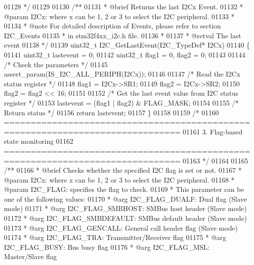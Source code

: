 \begin{DoxyCode}
01128 \textcolor{comment}{ */}
01129 
01130 \textcolor{comment}{/**}
01131 \textcolor{comment}{  * @brief  Returns the last I2Cx Event.}
01132 \textcolor{comment}{  * @param  I2Cx: where x can be 1, 2 or 3 to select the I2C peripheral.}
01133 \textcolor{comment}{  *     }
01134 \textcolor{comment}{  * @note   For detailed description of Events, please refer to section I2C\_Events}
01135 \textcolor{comment}{  *         in stm32f4xx\_i2c.h file.}
01136 \textcolor{comment}{  *    }
01137 \textcolor{comment}{  * @retval The last event}
01138 \textcolor{comment}{  */}
01139 uint32\_t I2C_GetLastEvent(I2C\_TypeDef* I2Cx)
01140 \{
01141   uint32\_t lastevent = 0;
01142   uint32\_t flag1 = 0, flag2 = 0;
01143 
01144   \textcolor{comment}{/* Check the parameters */}
01145   assert_param(IS\_I2C\_ALL\_PERIPH(I2Cx));
01146 
01147   \textcolor{comment}{/* Read the I2Cx status register */}
01148   flag1 = I2Cx->SR1;
01149   flag2 = I2Cx->SR2;
01150   flag2 = flag2 << 16;
01151 
01152   \textcolor{comment}{/* Get the last event value from I2C status register */}
01153   lastevent = (flag1 | flag2) & FLAG_MASK;
01154 
01155   \textcolor{comment}{/* Return status */}
01156   \textcolor{keywordflow}{return} lastevent;
01157 \}
01158 
01159 \textcolor{comment}{/*}
01160 \textcolor{comment}{ ===============================================================================}
01161 \textcolor{comment}{                          3. Flag-based state monitoring                   }
01162 \textcolor{comment}{ ===============================================================================  }
01163 \textcolor{comment}{ */}
01164 
01165 \textcolor{comment}{/**}
01166 \textcolor{comment}{  * @brief  Checks whether the specified I2C flag is set or not.}
01167 \textcolor{comment}{  * @param  I2Cx: where x can be 1, 2 or 3 to select the I2C peripheral.}
01168 \textcolor{comment}{  * @param  I2C\_FLAG: specifies the flag to check. }
01169 \textcolor{comment}{  *          This parameter can be one of the following values:}
01170 \textcolor{comment}{  *            @arg I2C\_FLAG\_DUALF: Dual flag (Slave mode)}
01171 \textcolor{comment}{  *            @arg I2C\_FLAG\_SMBHOST: SMBus host header (Slave mode)}
01172 \textcolor{comment}{  *            @arg I2C\_FLAG\_SMBDEFAULT: SMBus default header (Slave mode)}
01173 \textcolor{comment}{  *            @arg I2C\_FLAG\_GENCALL: General call header flag (Slave mode)}
01174 \textcolor{comment}{  *            @arg I2C\_FLAG\_TRA: Transmitter/Receiver flag}
01175 \textcolor{comment}{  *            @arg I2C\_FLAG\_BUSY: Bus busy flag}
01176 \textcolor{comment}{  *            @arg I2C\_FLAG\_MSL: Master/Slave flag}

\end{DoxyCode}
